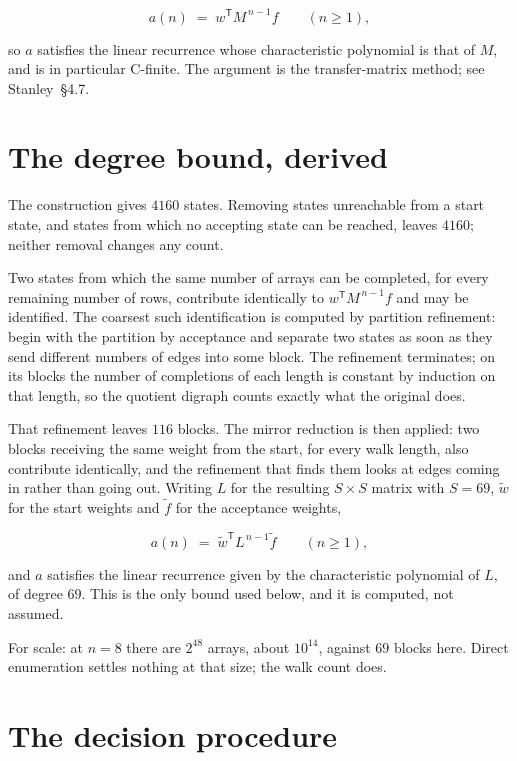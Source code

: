 \documentclass[11pt]{article}
\theoremstyle{definition}
\begin{document}
\[a(n) \;=\; w^{\mathsf T} M^{\,n-1} f \qquad (n \ge 1),\]

so $a$ satisfies the linear recurrence whose characteristic polynomial is that of $M$, and is in particular C-finite. The argument is the transfer-matrix method; see Stanley~\S4.7.

\section{The degree bound, derived}

The construction gives $4160$ states. Removing states unreachable from a start state, and states from which no accepting state can be reached, leaves $4160$; neither removal changes any count.

Two states from which the same number of arrays can be completed, for every remaining number of rows, contribute identically to $w^{\mathsf T}M^{\,n-1}f$ and may be identified. The coarsest such identification is computed by partition refinement: begin with the partition by acceptance and separate two states as soon as they send different numbers of edges into some block. The refinement terminates; on its blocks the number of completions of each length is constant by induction on that length, so the quotient digraph counts exactly what the original does.

That refinement leaves $116$ blocks. The mirror reduction is then applied: two blocks receiving the same weight from the start, for every walk length, also contribute identically, and the refinement that finds them looks at edges coming in rather than going out. Writing $L$ for the resulting $S \times S$ matrix with $S = 69$, $\tilde w$ for the start weights and $\tilde f$ for the acceptance weights,

\[a(n) \;=\; \tilde w^{\mathsf T} L^{\,n-1} \tilde f \qquad (n \ge 1),\]

and $a$ satisfies the linear recurrence given by the characteristic polynomial of $L$, of degree $69$. This is the only bound used below, and it is computed, not assumed.

For scale: at $n = 8$ there are $2^{48}$ arrays, about $10^{14}$, against $69$ blocks here. Direct enumeration settles nothing at that size; the walk count does.

\section{The decision procedure}
\end{document}
